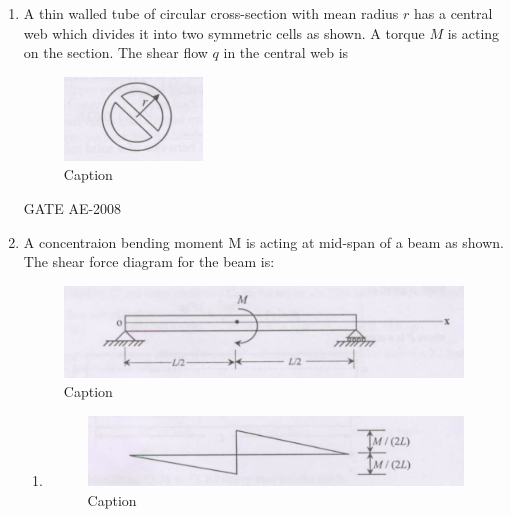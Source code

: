 \documentclass[journal,12pt,onecolumn]{IEEEtran}
\theoremstyle{remark}
\begin{document}
\begin{enumerate}
    \quad
    
\item A thin walled tube of circular cross-section with mean radius $r$ has a central web which divides it into two symmetric cells as shown. A torque $M$ is acting on the section. The shear flow $q$ in the central web is
\begin{figure}[H]
    \centering
    \includegraphics[width=0.5\linewidth]{figs/Screenshot from 2025-08-08 12-34-18.png}
    \caption{Caption}
    \label{fig:placeholder}
\end{figure}
\begin{enumerate}
\end{enumerate}
\hfill{GATE AE-2008}

\quad 

\item  A concentraion bending moment M is acting at mid-span of a beam as shown. The shear force diagram for the beam is:
\begin{figure}[H]
    \centering
    \includegraphics[width=0.5\linewidth]{figs/Screenshot from 2025-08-08 12-52-57.png}
    \caption{Caption}
    \label{fig:placeholder}
\end{figure}
\begin{enumerate}
    \item 
    \begin{figure}[H]
        \centering
        \includegraphics[width=0.5\linewidth]{figs/Screenshot from 2025-08-08 12-59-04.png}
        \caption{Caption}
    \label{fig:placeholder}
    \end{figure} 
    

\end{enumerate}
\end{enumerate}
\end{document}
